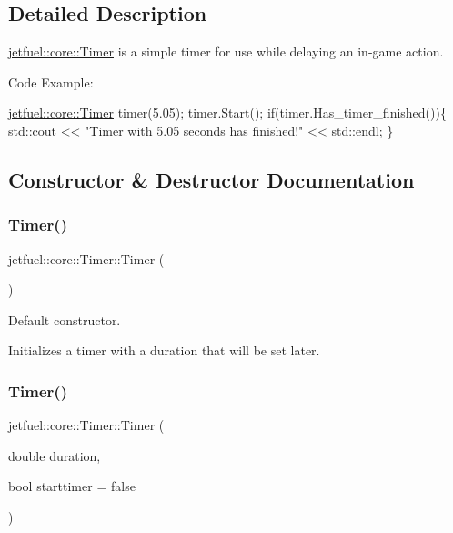 \subsection{Detailed Description}
\hyperlink{classjetfuel_1_1core_1_1Timer}{jetfuel\+::core\+::\+Timer} is a simple timer for use while delaying an in-\/game action.

Code Example\+: 
\begin{DoxyCode}
\hyperlink{classjetfuel_1_1core_1_1Timer}{jetfuel::core::Timer} timer(5.05);
timer.Start();
\textcolor{keywordflow}{if}(timer.Has\_timer\_finished())\{
    std::cout << \textcolor{stringliteral}{"Timer with 5.05 seconds has finished!"}
    << std::endl;
\}
\end{DoxyCode}
 

\subsection{Constructor \& Destructor Documentation}
\mbox{\label{classjetfuel_1_1core_1_1Timer_ac27fee7c9a0acbdbe7650b087ec26a7b}} 
\subsubsection{\texorpdfstring{Timer()}{Timer()}\hspace{0.1cm}{\footnotesize\ttfamily [1/2]}}
{\footnotesize\ttfamily jetfuel\+::core\+::\+Timer\+::\+Timer (\begin{DoxyParamCaption}{ }\end{DoxyParamCaption})\hspace{0.3cm}{\ttfamily [inline]}}



Default constructor. 

Initializes a timer with a duration that will be set later. \mbox{\label{classjetfuel_1_1core_1_1Timer_ad856b1bc0f24893dafd8c608831adcf9}} 
\subsubsection{\texorpdfstring{Timer()}{Timer()}\hspace{0.1cm}{\footnotesize\ttfamily [2/2]}}
{\footnotesize\ttfamily jetfuel\+::core\+::\+Timer\+::\+Timer (\begin{DoxyParamCaption}\item[{double}]{duration,  }\item[{bool}]{starttimer = {\ttfamily false} }\end{DoxyParamCaption})\hspace{0.3cm}{\ttfamily [inline]}}



